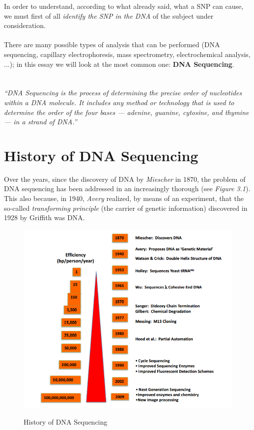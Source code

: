 In order to understand, according to what already said, what a SNP can cause, we must first of all \emph{identify the SNP in the DNA} of the subject under consideration.
\\
\\There are many possible types of analysis that can be performed (DNA sequencing, capillary electrophoresis, mass spectrometry, electrochemical analysis, ...); in this essay we will look at the most common one: \textbf{DNA Sequencing}.
\\
\\
\\\emph{“DNA Sequencing is the process of determining the precise order of nucleotides within a DNA molecule. It includes any method or technology that is used to determine the order of the four bases — adenine, guanine, cytosine, and thymine — in a strand of DNA.”}

\vspace{15mm}

\section{History of DNA Sequencing}

Over the years, since the discovery of DNA by \emph{Miescher} in 1870, the problem of DNA sequencing has been addressed in an increasingly thorough (see \emph{Figure 3.1}). This also because, in 1940, \emph{Avery} realized, by means of an experiment, that the so-called \emph{transforming principle} (the carrier of genetic information) discovered in 1928 by Griffith was DNA.

\vspace{15mm}

\begin{figure}[ht!]
	\centering
	\includegraphics[width=150mm]{../Images/DNASequencing_history.png}
	\label{overflow}
	\caption{History of DNA Sequencing}
	\end{figure}



